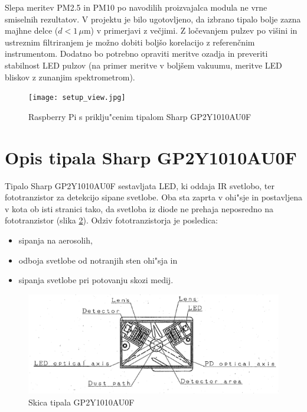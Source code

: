 \documentclass[11pt,a4paper]{article}
\begin{document}
 Slepa meritev PM2.5 in PM10 po navodilih proizvajalca modula ne vrne smiselnih rezultatov.
V projektu je bilo ugotovljeno, da izbrano tipalo bolje zazna majhne delce ($d < 1\,\mu$m) v primerjavi z večjimi. Z ločevanjem pulzev po višini in ustreznim filtriranjem je možno dobiti boljšo korelacijo z referenčnim instrumentom. Dodatno bo potrebno opraviti meritve ozadja in preveriti stabilnost LED pulzov (na primer meritve v boljšem vakuumu, meritve LED bliskov z zunanjim spektrometrom). 

\begin{figure}[bh!]
	\begin{center}
		\texttt{[image: setup\_view.jpg]}
		\caption{Raspberry Pi s priklju"cenim tipalom Sharp GP2Y1010AU0F}
		\label{setup-view}
	\end{center}
\end{figure}

\newpage
\section{Opis tipala Sharp GP2Y1010AU0F}

Tipalo Sharp GP2Y1010AU0F \cite{sharp-gp2y1010au0f} sestavljata LED, ki oddaja IR svetlobo, ter fototranzistor za detekcijo sipane svetlobe. Oba sta zaprta v ohi"sje in postavljena v kota ob isti stranici tako, da svetloba iz diode ne prehaja neposredno na fototranzistor (slika \ref{sensor-scheme}). Odziv fototranzistorja je posledica:
\begin{itemize}
	\item sipanja na aerosolih,
	\item odboja svetlobe od notranjih sten ohi"sja in
	\item sipanja svetlobe pri potovanju skozi medij.
\end{itemize}

\begin{figure}[H]
	\begin{center}
		\includegraphics[width=12cm]{sensor-scheme.png}
		\caption{Skica tipala GP2Y1010AU0F}
		\label{sensor-scheme}
	\end{center}
\end{figure}
\end{document}
